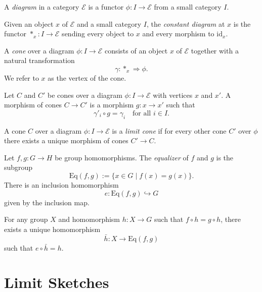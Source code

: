 \documentclass{tac}
\begin{document}
\begin{definition}
A \emph{diagram} in a category $\mathcal{E}$ is a functor $\phi : I \to \mathcal{E}$ from a small category $I$.
\end{definition}

\begin{definition}
Given an object $x$ of $\mathcal{E}$ and a small category $I$, the \emph{constant diagram} at $x$ is the functor $*_x : I \to \mathcal{E}$ sending every object to $x$ and every morphism to $\mathrm{id}_x$.
\end{definition}

\begin{definition}\label{cone_def}
A \emph{cone} over a diagram $\phi : I \to \mathcal{E}$ consists of an object $x$ of $\mathcal{E}$ together with a natural transformation
\[
\gamma : *_x \Rightarrow \phi.
\]
We refer to $x$ as the vertex of the cone.
\end{definition}

\begin{definition}
Let $C$ and $C'$ be cones over a diagram $\phi : I \to \mathcal{E}$ with vertices $x$ and $x'$. A morphism of cones $C \to C'$ is a morphism $g : x \to x'$ such that
\[
\gamma'_i \circ g = \gamma_i
\quad \text{for all } i \in I.
\]
\end{definition}

\begin{definition}
A cone $C$ over a diagram $\phi : I \to \mathcal{E}$ is a \emph{limit cone} if for every other cone $C'$ over $\phi$ there exists a unique morphism of cones $C' \to C$.
\end{definition}

\begin{example}
Let $f,g : G \to H$ be group homomorphisms. The \emph{equalizer} of $f$ and $g$ is the subgroup
\[
\mathrm{Eq}(f,g) := \{ x \in G \mid f(x) = g(x) \}.
\]
There is an inclusion homomorphism
\[
e : \mathrm{Eq}(f,g) \hookrightarrow G
\]
given by the inclusion map.

For any group $X$ and homomorphism $h : X \to G$ such that $f \circ h = g \circ h$, there exists a unique homomorphism
\[
\bar{h} : X \to \mathrm{Eq}(f,g)
\]
such that $e \circ \bar{h} = h$.
\end{example}

\section{Limit Sketches}
\end{document}
